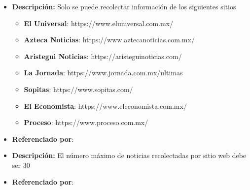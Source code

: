 \begin{itemize}
  \item \textbf{Descripción:} Solo se puede recolectar información de los siguientes sitios\\

  \begin{itemize}

    \item \textbf{El Universal}: https://www.eluniversal.com.mx/
    \item \textbf{Azteca Noticias}: https://www.aztecanoticias.com.mx/
    \item \textbf{Aristegui Noticias}: https://aristeguinoticias.com/
    \item \textbf{La Jornada}: https://www.jornada.com.mx/ultimas
    \item \textbf{Sopitas}: https://www.sopitas.com/
    \item \textbf{El Economista}: https://www.eleconomista.com.mx/
    \item \textbf{Proceso}: https://www.proceso.com.mx/

  \end{itemize} 
  \item \textbf{Referenciado por}:  \\
\end{itemize}
%


\begin{itemize}
  \item \textbf{Descripción:} El número máximo de noticias recolectadas por sitio web debe ser 30

  \item \textbf{Referenciado por}:  \\
\end{itemize}

